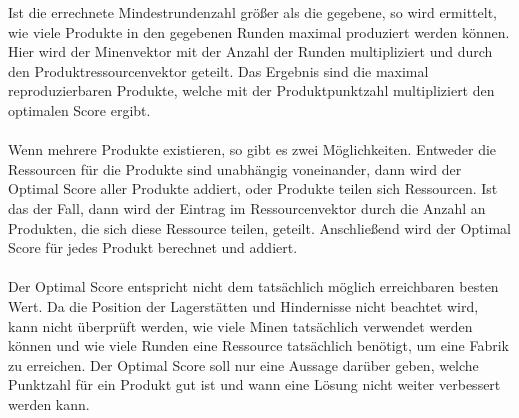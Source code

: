 Ist die errechnete Mindestrundenzahl größer als die gegebene, so wird ermittelt, wie viele Produkte in den gegebenen Runden maximal produziert werden können. Hier wird der Minenvektor mit der Anzahl der Runden multipliziert und durch den Produktressourcenvektor geteilt. Das Ergebnis sind die maximal reproduzierbaren Produkte, welche mit der Produktpunktzahl multipliziert den optimalen Score ergibt.
\\\\
Wenn mehrere Produkte existieren, so gibt es zwei Möglichkeiten. Entweder die Ressourcen für die Produkte sind unabhängig voneinander, dann wird der Optimal Score aller Produkte addiert, oder Produkte teilen sich Ressourcen. Ist das der Fall, dann wird der Eintrag im Ressourcenvektor durch die Anzahl an Produkten, die sich diese Ressource teilen, geteilt.
Anschließend wird der Optimal Score für jedes Produkt berechnet und addiert.
\\\\
Der Optimal Score entspricht nicht dem tatsächlich möglich erreichbaren besten Wert. Da die Position der Lagerstätten und Hindernisse nicht beachtet wird, kann nicht überprüft werden, wie viele Minen tatsächlich verwendet werden können und wie viele Runden eine Ressource tatsächlich benötigt, um eine Fabrik zu erreichen.
Der Optimal Score soll nur eine Aussage darüber geben, welche Punktzahl für ein Produkt gut ist und wann eine Lösung nicht weiter verbessert werden kann. 

